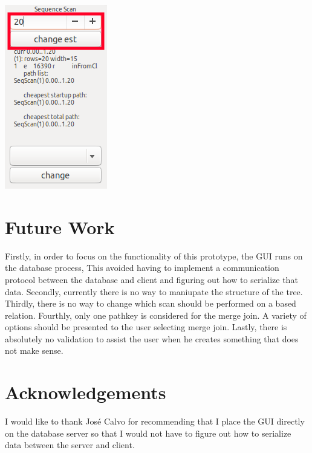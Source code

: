 \documentclass[letterpaper,10pt]{article}
\begin{document}
\begin{center}
\includegraphics[scale=0.5]{change-estimate.png}
\end{center}



\section{Future Work}
Firstly, in order to focus on the functionality of this prototype, the GUI runs
on the database process, This avoided having to implement a communication
protocol between the database and client and figuring out how to serialize that
data. Secondly, currently there is no way to maniupate the structure of the
tree. Thirdly, there is no way to change which scan should be performed on a
based relation. Fourthly, only one pathkey is considered for the merge join. A
variety of options should be presented to the user selecting merge join. Lastly,
there is absolutely no validation to assist the user when he creates something
that does not make sense.

\section{Acknowledgements}
I would like to thank José Calvo for recommending that I place the GUI directly
on the database server so that I would not have to figure out how to serialize
data between the server and client.

\nocite{*}               

     
\end{document}
